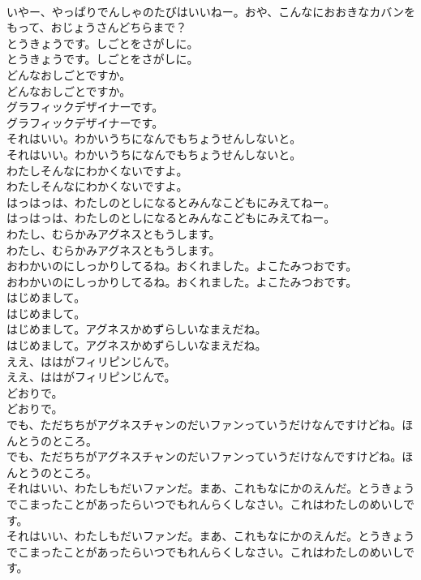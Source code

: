 \documentclass[8pt]{extreport}
\begin{document}
\begin{CJK}{UTF8}{min}
\\	いやー、やっぱりでんしゃのたびはいいねー。おや、こんなにおおきなカバンをもって、おじょうさんどちらまで？
\\	とうきょうです。しごとをさがしに。
\\	とうきょうです。しごとをさがしに。
\\	どんなおしごとですか。
\\	どんなおしごとですか。
\\	グラフィックデザイナーです。
\\	グラフィックデザイナーです。
\\	それはいい。わかいうちになんでもちょうせんしないと。
\\	それはいい。わかいうちになんでもちょうせんしないと。
\\	わたしそんなにわかくないですよ。
\\	わたしそんなにわかくないですよ。
\\	はっはっは、わたしのとしになるとみんなこどもにみえてねー。
\\	はっはっは、わたしのとしになるとみんなこどもにみえてねー。
\\	わたし、むらかみアグネスともうします。
\\	わたし、むらかみアグネスともうします。
\\	おわかいのにしっかりしてるね。おくれました。よこたみつおです。
\\	おわかいのにしっかりしてるね。おくれました。よこたみつおです。
\\	はじめまして。
\\	はじめまして。
\\	はじめまして。アグネスかめずらしいなまえだね。
\\	はじめまして。アグネスかめずらしいなまえだね。
\\	ええ、ははがフィリピンじんで。
\\	ええ、ははがフィリピンじんで。
\\	どおりで。
\\	どおりで。
\\	でも、ただちちがアグネスチャンのだいファンっていうだけなんですけどね。ほんとうのところ。
\\	でも、ただちちがアグネスチャンのだいファンっていうだけなんですけどね。ほんとうのところ。
\\	それはいい、わたしもだいファンだ。まあ、これもなにかのえんだ。とうきょうでこまったことがあったらいつでもれんらくしなさい。これはわたしのめいしです。
\\	それはいい、わたしもだいファンだ。まあ、これもなにかのえんだ。とうきょうでこまったことがあったらいつでもれんらくしなさい。これはわたしのめいしです。

\end{CJK}
\end{document}
